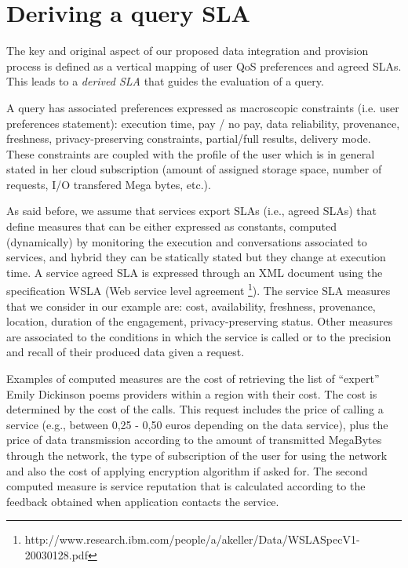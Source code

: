 \section{Deriving a query SLA}
\label{sec:slaModel}

The key and original aspect of   our proposed data integration and provision process is  defined as a vertical mapping of user QoS preferences and agreed SLAs. This  leads to a {\em derived SLA} that guides the evaluation of a query. 

A query has associated preferences  expressed as macroscopic constraints (i.e. user preferences statement): execution time, pay / no pay, data reliability, provenance, freshness, privacy-preserving constraints, partial/full results, delivery mode. These constraints are coupled with the profile of the user which is in general stated in her cloud subscription (amount of assigned storage space, number of requests, I/O transfered Mega bytes, etc.). 

As said before, we assume that services export SLAs (i.e., agreed SLAs) that define measures   that can be either expressed as constants,  computed (dynamically) by monitoring the execution and conversations associated to services, and hybrid they can be statically stated  but they change at execution time.  A service  agreed SLA is expressed through an  XML document using the specification WSLA (Web service level agreement \footnote{\footnotesize http://www.research.ibm.com/people/a/akeller/\-Data/WSLASpecV1-20030128.pdf}). The service SLA measures  that we consider in our example are: cost, availability, freshness, provenance, location, duration of the engagement, privacy-preserving status. Other measures are associated to the conditions in which the service is called or to the precision and recall of their produced data given a request. 

Examples of computed measures are the cost of retrieving the list of ``expert'' Emily Dickinson poems providers within a region with their cost. 
The cost is determined by the  cost of the calls. 
This request  includes the price of calling a service (e.g.,  between 0,25 - 0,50 euros depending on the data service), plus the price of data transmission according to the amount of transmitted MegaBytes through the network, the type of subscription of the user for using the network and also the cost of applying encryption algorithm if asked for. The second computed measure is service reputation that is calculated according to the feedback obtained when application contacts the service.

